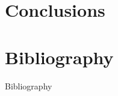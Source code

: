 \documentclass[presentation]{beamer}
\begin{document}
\section{Conclusions}
\label{sec-4}
\section{Bibliography}
\label{sec-5}
\begin{frame}[label=sec-5-1]{Bibliography}



\appendix
\end{frame}
\end{document}

